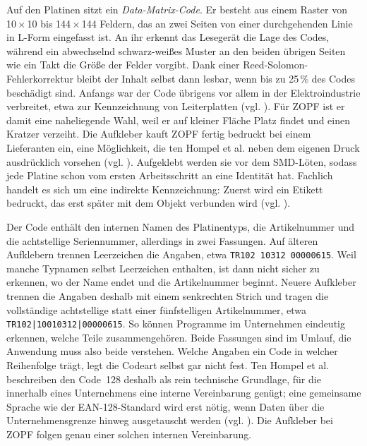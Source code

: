 Auf den Platinen sitzt ein \emph{Data-Matrix-Code}. Er besteht aus einem
Raster von 10\,$\times$\,10 bis 144\,$\times$\,144 Feldern, das an zwei Seiten
von einer durchgehenden Linie in L-Form eingefasst ist. An ihr erkennt das
Lesegerät die Lage des Codes, während ein abwechselnd schwarz-weißes Muster an
den beiden übrigen Seiten wie ein Takt die Größe der Felder vorgibt. Dank einer
Reed-Solomon-Fehlerkorrektur bleibt der Inhalt selbst dann lesbar, wenn bis zu
25\,\% des Codes beschädigt sind. Anfangs war der Code übrigens vor allem in der
Elektroindustrie verbreitet, etwa zur Kennzeichnung von Leiterplatten (vgl.
\cite[S.~84]{tenhompelIdentifikationssystemeUndAutomatisierung2008}). Für ZOPF ist er damit eine
naheliegende Wahl, weil er auf kleiner Fläche Platz findet und einen Kratzer
verzeiht. Die Aufkleber kauft ZOPF fertig bedruckt bei einem Lieferanten ein,
eine Möglichkeit, die ten Hompel et al. neben dem eigenen Druck ausdrücklich vorsehen (vgl.
\cite[S.~24, 98]{tenhompelIdentifikationssystemeUndAutomatisierung2008}). Aufgeklebt werden sie vor
dem SMD-Löten, sodass jede Platine schon vom ersten Arbeitsschritt an eine
Identität hat. Fachlich handelt es sich um eine indirekte Kennzeichnung: Zuerst
wird ein Etikett bedruckt, das erst später mit dem Objekt verbunden wird (vgl.
\cite[S.~95\,f.]{tenhompelIdentifikationssystemeUndAutomatisierung2008}).

Der Code enthält den internen Namen des Platinentyps, die Artikelnummer und die
achtstellige Seriennummer, allerdings in zwei Fassungen. Auf älteren Aufklebern
trennen Leerzeichen die Angaben, etwa \texttt{TR102 10312 00000615}. Weil manche
Typnamen selbst Leerzeichen enthalten, ist dann nicht sicher zu erkennen, wo der
Name endet und die Artikelnummer beginnt. Neuere Aufkleber trennen die Angaben
deshalb mit einem senkrechten Strich und tragen die vollständige achtstellige
statt einer fünfstelligen Artikelnummer, etwa
\texttt{TR102|10010312|00000615}. So können Programme im Unternehmen eindeutig
erkennen, welche Teile zusammengehören. Beide Fassungen sind im Umlauf, die
Anwendung muss also beide verstehen. Welche Angaben ein Code in welcher
Reihenfolge trägt, legt die Codeart selbst gar nicht fest. Ten Hompel et al.
beschreiben den Code~128 deshalb als rein technische Grundlage, für die innerhalb
eines Unternehmens eine interne Vereinbarung genügt; eine gemeinsame Sprache wie
der EAN-128-Standard wird erst nötig, wenn Daten über die Unternehmensgrenze
hinweg ausgetauscht werden (vgl. \cite[S.~57]{tenhompelIdentifikationssystemeUndAutomatisierung2008}).
Die Aufkleber bei ZOPF folgen genau einer solchen internen Vereinbarung.

